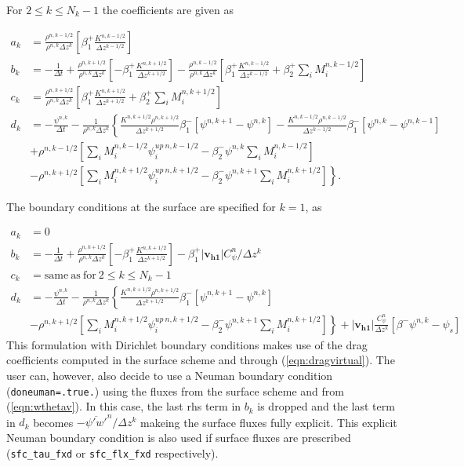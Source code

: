 \documentclass[dvipdfmx,a4paper,10pt]{article}
\begin{document}
\noindent For $2\leq k \leq N_k-1$ the coefficients are given as 

\begin{align*}
  a_k &=  \frac{\rho^{n,k-1/2}}{\rho^{n,k}\Delta z^k} \left[\beta_1^+ \frac{K^{n,k-1/2}}{\Delta z ^{k-1/2}}\right]\\
    b_k &= -\frac{1}{\Delta t} + \frac{\rho^{n,k+1/2}}{\rho^{n,k}\Delta z^k} \left[-\beta_1^+\frac{K^{n,k+1/2}}{\Delta z ^{k+1/2}} \right]-\frac{\rho^{n,k-1/2}}{\rho^{n,k}\Delta z^k} \left[\beta_1^+\frac{K^{n,k-1/2}}{\Delta z ^{k-1/2}}+\beta_2^+\sum_iM_i^{n,k-1/2} \right] \\
      c_k &= \frac{\rho^{n,k+1/2}}{\rho^{n,k}\Delta z^k}\left[\beta_1^+ \frac{K^{n,k+1/2}}{\Delta z ^{k+1/2}}+\beta_2^+\sum_iM_i^{n,k+1/2} \right] \\
      d_k &=-\frac{\psi^{n,k}}{\Delta t} - \frac{1}{\rho^{n,k}\Delta z^k} \left\{ \frac{K^{n,k+1/2}\rho^{n,k+1/2}}{\Delta z^{k+1/2}}\beta_1^{-}\left[\psi^{n,k+1} - \psi^{n,k}\right]-\frac{K^{n,k-1/2}\rho^{n,k-1/2}}{\Delta z^{k-1/2}}\beta_1^{-}\left[\psi^{n,k} - \psi^{n,k-1}\right]\right.   \\   
          & \left.+\rho^{n,k-1/2}\left[\sum_iM_i^{n,k-1/2}\psi_i^{up~n,k-1/2} - \beta_2^{-}\psi^{n,k}\sum_iM_i^{n,k-1/2} \right]\right.\\
          & \left. -\rho^{n,k+1/2}\left[\sum_iM_i^{n,k+1/2}\psi_i^{up~n,k+1/2} - \beta_2^{-}\psi^{n,k+1}\sum_iM_i^{n,k+1/2} \right] \right\}.
\end{align*}

\noindent The boundary conditions at the surface are specified for $k=1$, as

\begin{align*}
  a_k &= 0 \\
    b_k &= -\frac{1}{\Delta t} +\frac{\rho^{n,k+1/2}}{\rho^{n,k}\Delta z^k} \left[- \beta_1^+\frac{K^{n,k+1/2}}{\Delta z^{k+1/2}} \right]-\beta_1^+|\mathbf{v_{h1}}|C^n_{\psi}/\Delta z^k  \\
      c_k &= \mathrm{same~as~for~}2\leq k \leq N_k-1 \\
      d_k &=  -\frac{\psi^{n,k}}{\Delta t} - \frac{1}{\rho^{n,k}\Delta z^k} \left\{ \frac{K^{n,k+1/2}\rho^{n,k+1/2}}{\Delta z^{k+1/2}}\beta_1^{-}\left[\psi^{n,k+1} - \psi^{n,k}\right]\right.   \\   
          & \left. -\rho^{n,k+1/2}\left[\sum_iM_i^{n,k+1/2}\psi_i^{up~n,k+1/2} -\beta_2^{-}\psi^{n,k+1}\sum_iM_i^{n,k+1/2} \right] \right\} +|\mathbf{v_{h1}}|\frac{C^n_{\psi}}{\Delta z^k}\left[\beta^-\psi^{n,k} - \psi_s\right]    
\end{align*}
This formulation with Dirichlet boundary conditions makes use of the drag coefficients computed in the surface scheme and through (\ref{eqn:dragvirtual}). The user can, however, also decide to use a Neuman boundary condition ({\tt doneuman=.true.}) using the fluxes from the surface scheme and from (\ref{eqn:wthetav}). In this case, the last rhs term in $b_k$ is dropped and the last term in $d_k$ becomes $- \overline{\psi'w'}^n/\Delta z^k$ makeing the surface fluxes fully explicit. This explicit Neuman boundary condition is also used if surface fluxes are prescribed ({\tt sfc\_tau\_fxd} or {\tt sfc\_flx\_fxd} respectively). 
\end{document}
